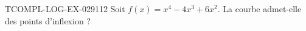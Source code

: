 \begin{exercice}{TCOMPL-LOG-EX-029}{1}{12}
Soit $f(x) = x^4 - 4x^3 + 6x^2$. La courbe admet-elle des points d'inflexion ?

\end{exercice}
